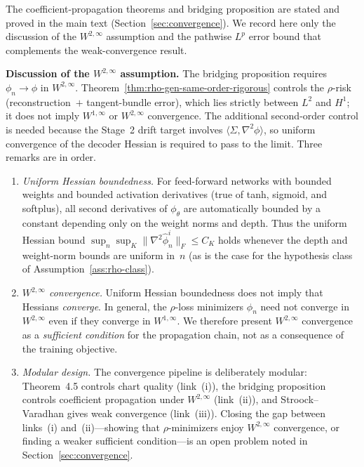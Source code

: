 \documentclass[11pt]{article}
\begin{document}
The coefficient-propagation theorems and bridging
proposition are stated and proved in the main text
(Section~\ref{sec:convergence}).
We record here only the discussion of the
$W^{2,\infty}$ assumption and the pathwise $L^p$
error bound that complements the weak-convergence
result.

\noindent \textbf{Discussion of the $W^{2,\infty}$ assumption.}
The bridging proposition requires $\phi_n\to\phi$ in $W^{2,\infty}$.
Theorem~\ref{thm:rho-gen-same-order-rigorous} controls the $\rho$-risk
(reconstruction~$+$ tangent-bundle error), which lies strictly
between $L^2$ and $H^1$; it does not imply $W^{1,\infty}$ or
$W^{2,\infty}$ convergence.
The additional second-order control is needed because the Stage~2
drift target involves
$\langle\Sigma,\nabla^2\phi\rangle$, so uniform convergence of
the decoder Hessian is required to pass to the limit.
Three remarks are in order.
\begin{enumerate}[leftmargin=*]
\item \emph{Uniform Hessian boundedness.}
  For feed-forward networks with bounded weights and bounded
  activation derivatives (true of tanh, sigmoid, and softplus),
  all second derivatives of $\phi_\theta$ are automatically
  bounded by a constant depending only on the weight norms and
  depth.
  Thus the uniform Hessian bound
  $\sup_n\sup_K\|\nabla^2\hat\phi_n^i\|_F\le C_K$
  holds whenever the depth and weight-norm bounds are
  uniform in~$n$ (as is the case for the hypothesis class
  of Assumption~\ref{ass:rho-class}).
\item \emph{$W^{2,\infty}$ convergence.}
  Uniform Hessian boundedness does not imply that Hessians
  \emph{converge}.
  In general, the $\rho$-loss minimizers $\phi_n$ need not
  converge in $W^{2,\infty}$ even if they converge in
  $W^{1,\infty}$.
  We therefore present $W^{2,\infty}$ convergence as a
  \emph{sufficient condition} for the propagation chain,
  not as a consequence of the training objective.
\item \emph{Modular design.}
  The convergence pipeline is deliberately modular:
  Theorem~4.5 controls chart quality (link~(i)),
  the bridging proposition controls coefficient
  propagation under $W^{2,\infty}$ (link~(ii)),
  and Stroock--Varadhan gives weak convergence (link~(iii)).
  Closing the gap between links~(i) and~(ii)---showing that
  $\rho$-minimizers enjoy $W^{2,\infty}$ convergence, or
  finding a weaker sufficient condition---is an open problem
  noted in Section~\ref{sec:convergence}.
\end{enumerate}
\end{document}
